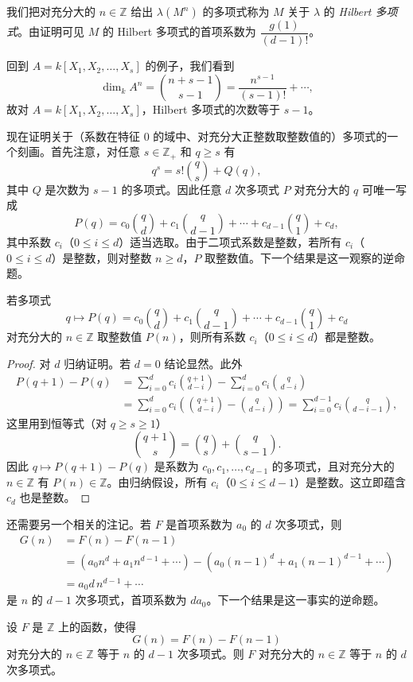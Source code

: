 我们把对充分大的 $n\in\mathbb{Z}$ 给出 $\lambda(M^n)$ 的多项式称为 $M$ 关于 $\lambda$ 的 \emph{Hilbert 多项式}。由证明可见 $M$ 的 Hilbert 多项式的首项系数为 $\dfrac{g(1)}{(d-1)!}$。

回到 $A=k[X_1,X_2,\dots,X_s]$ 的例子，我们看到
$$\dim_k A^n=\binom{n+s-1}{s-1}=\frac{n^{s-1}}{(s-1)!}+\cdots,$$
故对 $A=k[X_1,X_2,\dots,X_s]$，Hilbert 多项式的次数等于 $s-1$。

现在证明关于（系数在特征 $0$ 的域中、对充分大正整数取整数值的）多项式的一个刻画。首先注意，对任意 $s\in\mathbb{Z}_+$ 和 $q\ge s$ 有
$$q^s=s!\binom{q}{s}+Q(q),$$
其中 $Q$ 是次数为 $s-1$ 的多项式。因此任意 $d$ 次多项式 $P$ 对充分大的 $q$ 可唯一写成
$$P(q)=c_0\binom{q}{d}+c_1\binom{q}{d-1}+\cdots+c_{d-1}\binom{q}{1}+c_d,$$
其中系数 $c_i$（$0\le i\le d$）适当选取。由于二项式系数是整数，若所有 $c_i$（$0\le i\le d$）是整数，则对整数 $n\ge d$，$P$ 取整数值。下一个结果是这一观察的逆命题。

\begin{lemma}
若多项式
$$q\longmapsto P(q)=c_0\binom{q}{d}+c_1\binom{q}{d-1}+\cdots+c_{d-1}\binom{q}{1}+c_d$$
对充分大的 $n\in\mathbb{Z}$ 取整数值 $P(n)$，则所有系数 $c_i$（$0\le i\le d$）都是整数。
\end{lemma}

\begin{proof}
对 $d$ 归纳证明。若 $d=0$ 结论显然。此外
\begin{align*}
P(q+1)-P(q)&=\sum_{i=0}^d c_i\binom{q+1}{d-i}-\sum_{i=0}^d c_i\binom{q}{d-i}\\
&=\sum_{i=0}^d c_i\left(\binom{q+1}{d-i}-\binom{q}{d-i}\right)=\sum_{i=0}^{d-1}c_i\binom{q}{d-i-1},
\end{align*}
这里用到恒等式（对 $q\ge s\ge 1$）
$$\binom{q+1}{s}=\binom{q}{s}+\binom{q}{s-1}.$$
因此 $q\longmapsto P(q+1)-P(q)$ 是系数为 $c_0,c_1,\dots,c_{d-1}$ 的多项式，且对充分大的 $n\in\mathbb{Z}$ 有 $P(n)\in\mathbb{Z}$。由归纳假设，所有 $c_i$（$0\le i\le d-1$）是整数。这立即蕴含 $c_d$ 也是整数。
\end{proof}

还需要另一个相关的注记。若 $F$ 是首项系数为 $a_0$ 的 $d$ 次多项式，则
\begin{align*}
G(n)&=F(n)-F(n-1)\\
&=(a_0 n^d+a_1 n^{d-1}+\cdots)-(a_0(n-1)^d+a_1(n-1)^{d-1}+\cdots)\\
&=a_0 d\, n^{d-1}+\cdots
\end{align*}
是 $n$ 的 $d-1$ 次多项式，首项系数为 $d a_0$。下一个结果是这一事实的逆命题。

\begin{lemma}
设 $F$ 是 $\mathbb{Z}$ 上的函数，使得
$$G(n)=F(n)-F(n-1)$$
对充分大的 $n\in\mathbb{Z}$ 等于 $n$ 的 $d-1$ 次多项式。则 $F$ 对充分大的 $n\in\mathbb{Z}$ 等于 $n$ 的 $d$ 次多项式。
\end{lemma}

